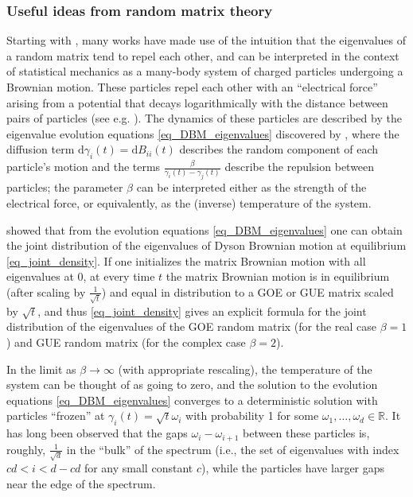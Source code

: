 \documentclass[11pt,letterpaper]{article}
\begin{document}
\subsubsection{Useful ideas from random matrix theory} Starting with \cite{dyson1963random, ginibre1965statistical}, many works have made use of the intuition that the eigenvalues of a random matrix tend to repel each other, and can be interpreted in the context of statistical mechanics as a many-body system of charged particles undergoing a Brownian motion.
%
These particles repel each other with an ``electrical force'' arising from a potential that decays logarithmically with the distance between pairs of particles (see e.g. \cite{rodriguez2014calibration}). 
%
The dynamics of these particles are described by the eigenvalue evolution equations \eqref{eq_DBM_eigenvalues} discovered by \cite{dyson1963random}, where the diffusion term $\mathrm{d} \gamma_i(t) = \mathrm{d}B_{i i}(t)$ describes the random component of each particle's motion and the terms $\frac{\beta}{\gamma_i(t) - \gamma_j(t)}$ describe the repulsion between particles; the parameter $\beta$ can be interpreted either as the strength of the electrical force, or equivalently, as the (inverse) temperature of the system.
%

\cite{dyson1963random} showed that from the evolution equations \eqref{eq_DBM_eigenvalues} one can obtain the joint distribution of the eigenvalues of Dyson Brownian motion at equilibrium \eqref{eq_joint_density}.
%
If one initializes the matrix Brownian motion with all eigenvalues at $0$, at every time $t$ the matrix Brownian motion is in equilibrium (after scaling by $\frac{1}{\sqrt{t}}$) and equal in distribution to a GOE or GUE matrix scaled by $\sqrt{t}$, and thus \eqref{eq_joint_density} gives an explicit formula for the joint distribution of the eigenvalues of the GOE random matrix (for the real case $\beta = 1$) and GUE random matrix (for the complex case $\beta = 2$).


In the limit as $\beta\rightarrow \infty$ (with appropriate rescaling), the temperature of the system can be thought of as going to zero, and the solution to the evolution equations \eqref{eq_DBM_eigenvalues} converges to a deterministic solution with particles ``frozen'' at  $\gamma_i(t) = \sqrt{t}\omega_i$ with probability 1 for some $\omega_1,\ldots, \omega_d \in \mathbb{R}$.
%
It has long been observed \cite{ginibre1965statistical, girko1985circular} that the gaps $\omega_i - \omega_{i+1}$ between these particles is, roughly, $\frac{1}{\sqrt{d}}$ in the ``bulk'' of the spectrum (i.e., the set of eigenvalues with index $cd <i< d- cd$ for any small constant $c$), while the particles have larger gaps near the edge of the spectrum.
\end{document}
